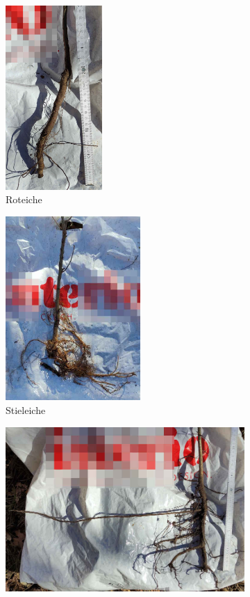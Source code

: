 \documentclass[twocolumn]{scrartcl}
\begin{document}
\begin{figure}[htbp]
  \centering
  \begin{subfigure}[t]{0.4\linewidth}
    \centering
    \includegraphics[height=7cm]{./bild/wurzelRoteiche}
    \caption{Roteiche}
  \end{subfigure}%
  \begin{subfigure}[t]{0.55\linewidth}
    \centering
    \includegraphics[height=7cm]{./bild/wurzelStieleiche}
    \caption{Stieleiche}
  \end{subfigure}
  \begin{subfigure}[t]{0.95\linewidth}
    \centering
    \includegraphics[width=\linewidth]{./bild/wurzelTraubeneiche}

\end{subfigure}
\end{figure}
\end{document}
